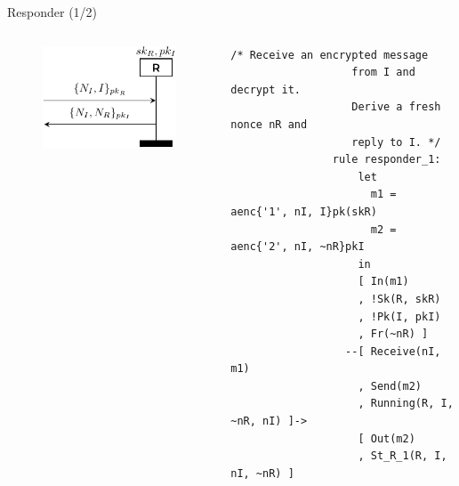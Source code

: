 \documentclass[11pt,aspectratio=169]{beamer}
\begin{document}
\begin{frame}[fragile]{Responder (1/2)}
    \begin{columns}
        \begin{column}{0.5\textwidth}
            \begin{figure}
                \includegraphics[width=.8\textwidth]
                    {./figures/lecture_3/nspk_r1}
            \end{figure}
        \end{column}
        \begin{column}{0.5\textwidth}
            \begin{lstlisting}[style=tamarin, gobble=16]
                /* Receive an encrypted message
                   from I and decrypt it.
                   Derive a fresh nonce nR and
                   reply to I. */
                rule responder_1:
                    let
                      m1 = aenc{'1', nI, I}pk(skR)
                      m2 = aenc{'2', nI, ~nR}pkI
                    in
                    [ In(m1)
                    , !Sk(R, skR)
                    , !Pk(I, pkI)
                    , Fr(~nR) ]
                  --[ Receive(nI, m1)
                    , Send(m2)
                    , Running(R, I, ~nR, nI) ]->
                    [ Out(m2)
                    , St_R_1(R, I, nI, ~nR) ]
            \end{lstlisting}
        \end{column}
    \end{columns}
    \vsep
\end{frame}
\end{document}
